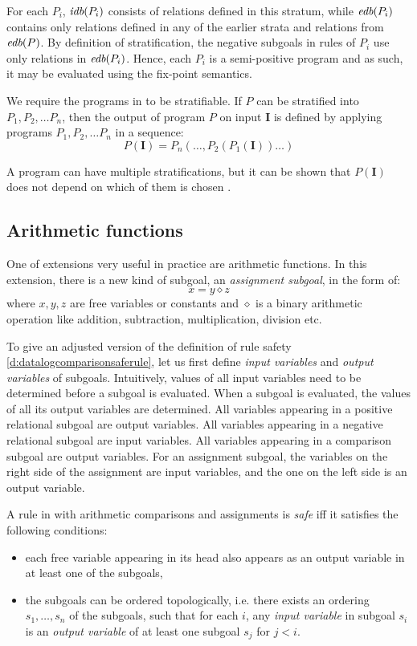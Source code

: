 For each $P_i$, $\textit{idb}(P_i)$ consists of relations defined in this stratum, while $\textit{edb}(P_i)$ contains only relations defined in any of the earlier strata and relations from $\textit{edb}(P)$. By definition of stratification, the negative subgoals in rules of $P_i$ use only relations in $\textit{edb}(P_i)$. Hence, each $P_i$ is a semi-positive program and as such, it may be evaluated using the fix-point semantics.

We require the programs in \datalogneg to be stratifiable. If $P$ can be stratified into $P_1, P_2, \dots P_n$, then the output of program $P$ on input $\textbf{I}$ is defined by applying programs $P_1, P_2, \dots P_n$ in a sequence:
$$P(\textbf{I}) = P_n(\dots, P_2(P_1(\textbf{I}))\dots)$$

A program can have multiple stratifications, but it can be shown that $P(\textbf{I})$ does not depend on which of them is chosen \cite{fod}.

\subsection{Arithmetic functions}

One of extensions very useful in practice are arithmetic functions. In this extension, there is a new kind of subgoal, an \emph{assignment subgoal}, in the form of:
$$x = y \diamond z$$
where $x, y, z$ are free variables or constants and $\diamond$ is a binary arithmetic operation like addition, subtraction, multiplication, division etc.

To give an adjusted version of the definition of rule safety \ref{d:datalogcomparisonsaferule}, let us first define \emph{input variables} and \emph{output variables} of subgoals. Intuitively, values of all input variables need to be determined before a subgoal is evaluated. When a subgoal is evaluated, the values of all its output variables are determined. All variables appearing in a positive relational subgoal are output variables. All variables appearing in a negative relational subgoal are input variables. All variables appearing in a comparison subgoal are output variables. For an assignment subgoal, the variables on the right side of the assignment are input variables, and the one on the left side is an output variable.

\begin{defn}\label{d:datalogeqsaferule}
A rule in \datalogneg with arithmetic comparisons and assignments is \emph{safe} iff it satisfies the following conditions:
\begin{itemize}
\item each free variable appearing in its head also appears as an output variable in at least one of the subgoals,
\item the subgoals can be ordered topologically, i.e. there exists an ordering $s_1, \dots, s_n$ of the subgoals, such that for each $i$, any \emph{input variable} in subgoal $s_i$ is an \emph{output variable} of at least one subgoal $s_j$ for $j < i$. 
\end{itemize}
\end{defn}

